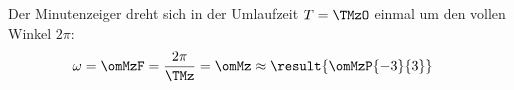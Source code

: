 Der Minutenzeiger dreht sich in der Umlaufzeit $T = \TMzO$ einmal um den vollen Winkel $2\pi$:
\begin{align}
 \omega &= \omMzF = \frac{2\pi}{\TMz} = \omMz \approx \result{\omMzP{-3}{3}}
\end{align}
